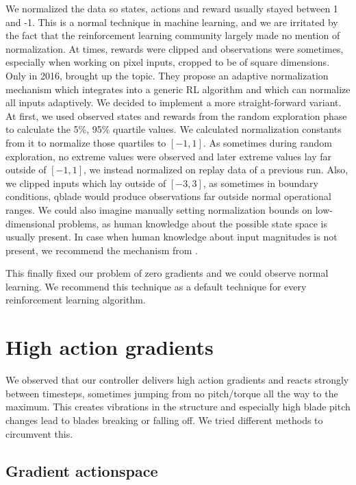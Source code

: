 \documentclass[hyperref,german,beleg]{cgvpub}
\begin{document}
We normalized the data so states, actions and reward usually stayed between 1 and -1. This is a normal technique in machine learning, and we are irritated by the fact that the reinforcement learning community largely made no mention of normalization. At times, rewards were clipped \cite{mnihPlayingAtariDeep2013} and observations were sometimes, especially when working on pixel inputs, cropped to be of square dimensions. Only in 2016, \cite{vanhasseltLearningValuesMany2016} brought up the topic. They propose an adaptive normalization mechanism which integrates into a generic \ac{RL} algorithm and which can normalize all inputs adaptively. We decided to implement a more straight-forward variant. At first, we used observed states and rewards from the random exploration phase to calculate the 5\%, 95\% quartile values. We calculated normalization constants from it to normalize those quartiles to $[-1, 1]$. As sometimes during random exploration, no extreme values were observed and later extreme values lay far outside of $[-1, 1]$, we instead normalized on replay data of a previous run. Also, we clipped inputs which lay outside of $[-3, 3]$, as sometimes in boundary conditions, qblade would produce observations far outside normal operational ranges. We could also imagine manually setting normalization bounds on low-dimensional problems, as human knowledge about the possible state space is usually present. In case when human knowledge about input magnitudes is not present, we recommend the mechanism from \cite{vanhasseltLearningValuesMany2016}.

This finally fixed our problem of zero gradients and we could observe normal learning. We recommend this technique as a default technique for every reinforcement learning algorithm. 

\section{High action gradients}

We observed that our controller delivers high action gradients and reacts strongly between timesteps, sometimes jumping from no pitch/torque all the way to the maximum. This creates vibrations in the structure and especially high blade pitch changes lead to blades breaking or falling off. We tried different methods to circumvent this.

\subsection{Gradient actionspace}
\end{document}

